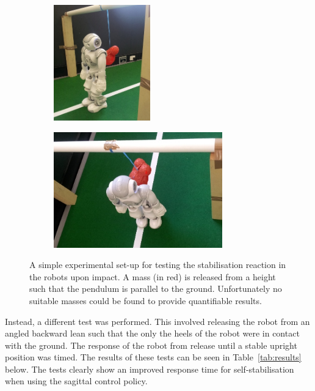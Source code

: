 \begin{figure}[h]
\centering
\begin{subfigure}{0.3\textwidth}
  \centering
  \includegraphics[height=5cm]{img/silly1.jpg}
\end{subfigure}
\begin{subfigure}{0.45\textwidth}
  \centering
  \includegraphics[height=5cm]{img/silly2.jpg}
\end{subfigure}
\caption{A simple experimental set-up for testing the stabilisation reaction in the robots upon impact. A mass (in red) is released from a height such that the pendulum is parallel to the ground. Unfortunately no suitable masses could be found to provide quantifiable results.}
\label{fig:silly_experiment}
\end{figure}

Instead, a different test was performed. This involved releasing the robot from an angled backward lean such that the only the heels of the robot were in contact with the ground. The response of the robot from release until a stable upright position was timed. The results of these tests can be seen in Table~\ref{tab:results} below. The tests clearly show an improved response time for self-stabilisation when using the sagittal control policy.

